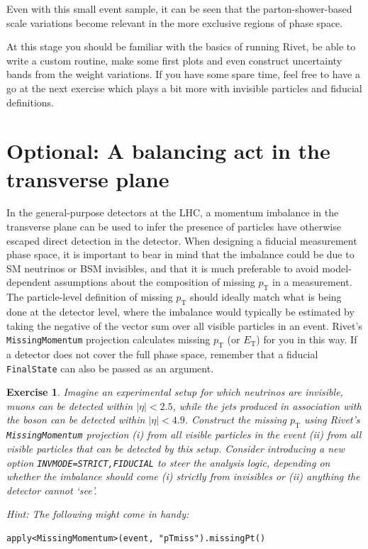 \documentclass[10pt,fleqn]{scrartcl}
\theoremstyle{exstyle}
\newtheorem{exercise}{Exercise}
\begin{document}
Even with this small event sample, it can be seen that the parton-shower-based
scale variations become relevant in the more exclusive regions of phase space.

At this stage you should be familiar with the basics of running Rivet,
be able to write a custom routine, make some first plots 
and even construct uncertainty bands from the weight variations.
If you have some spare time, feel free to have a go at the next exercise
which plays a bit more with invisible particles and fiducial definitions.


\section{Optional: A balancing act in the transverse plane}

In the general-purpose detectors at the LHC, a momentum imbalance 
in the transverse plane can be used to infer the presence
of particles have otherwise escaped direct detection in the detector.
When designing a fiducial measurement phase space, it is important 
to bear in mind that the imbalance could be due to SM neutrinos or BSM invisibles,
and that it is much preferable to avoid model-dependent assumptions 
about the composition of missing $p_\text{T}$ in a measurement.
The particle-level definition of missing $p_\text{T}$ should ideally match what is being done
at the detector level, where the imbalance would typically be estimated
by taking the negative of the vector sum over all visible particles in an event.
Rivet's \verb|MissingMomentum| projection calculates missing $p_\text{T}$ (or $E_\text{T}$) for you in this way. 
If a detector does not cover the full phase space, 
remember that a fiducial \verb|FinalState| can also be passed as an argument.

\begin{exercise}
Imagine an experimental setup for which neutrinos are invisible, 
muons can be detected within $|\eta| < 2.5$, 
while the jets produced in association with the
boson can be detected within $|\eta| < 4.9$.
Construct the missing $p_\text{T}$ using Rivet's \verb|MissingMomentum| projection
(\emph{i}) from all visible particles in the event
(\emph{ii}) from all visible particles that can be detected by this setup.
Consider introducing a new option \verb|INVMODE=STRICT,FIDUCIAL| to steer the analysis logic, 
depending on whether the imbalance should come (\emph{i}) strictly from invisibles or
(\emph{ii}) anything the detector cannot `see'.

\emph{Hint:} The following might come in handy: 
\begin{verbatim}
apply<MissingMomentum>(event, "pTmiss").missingPt()
\end{verbatim}
\end{exercise}
\end{document}
